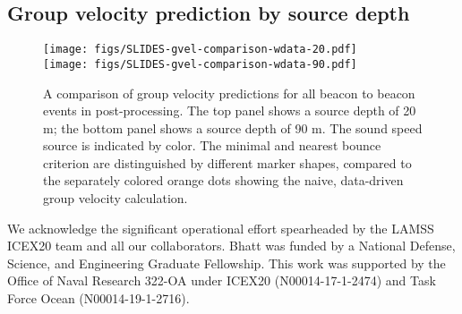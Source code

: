 \clearpage
\FloatBarrier
\subsection*{Group velocity prediction by source depth}
\begin{figure}[h!]
\texttt{[image: figs/SLIDES-gvel-comparison-wdata-20.pdf]} \\
\vspace{2em}
\texttt{[image: figs/SLIDES-gvel-comparison-wdata-90.pdf]}
\caption{A comparison of group velocity predictions for all beacon to beacon events in post-processing. The top panel shows a source depth of 20 m; the bottom panel shows a source depth of 90 m. The sound speed source is indicated by color. The minimal and nearest bounce criterion are distinguished by different marker shapes, compared to the separately colored orange dots showing the naive, data-driven group velocity calculation.}
\label{fig:gvelMore}
\end{figure}




\begin{acknowledgments}
We acknowledge the significant operational effort spearheaded by the LAMSS ICEX20 team and all our collaborators.
Bhatt was funded by a National Defense, Science, and Engineering Graduate Fellowship.
This work was supported by the Office of Naval Research 322-OA under ICEX20 (N00014-17-1-2474) and Task Force Ocean (N00014-19-1-2716).

\end{acknowledgments}

